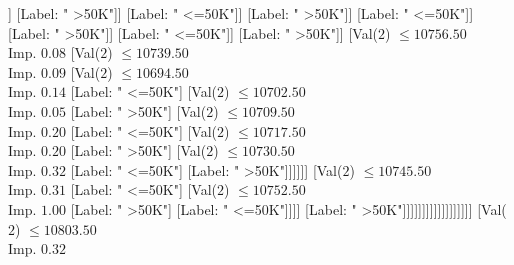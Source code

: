 \documentclass[margin=10pt]{standalone}
\begin{document}
\begin{forest}
																																		[Val($2$) $ \leq 10543.50$ \\ Imp. $0.16$
																																			[Val($2$) $ \leq 10534.50$ \\ Imp. $0.31$
																																				[Val($2$) $ \leq 10518.50$ \\ Imp. $0.19$
																																					[Val($2$) $ \leq 10517.50$ \\ Imp. $0.92$
																																						[Label: " >50K"]
																																						[Label: " <=50K"]]
																																					[Label: " >50K"]]
																																				[Label: " <=50K"]]
																																			[Label: " >50K"]]
																																		[Label: " <=50K"]]
																																	[Label: " >50K"]]
																																[Label: " <=50K"]]
																															[Label: " >50K"]]
																														[Val($2$) $ \leq 10756.50$ \\ Imp. $0.08$
																															[Val($2$) $ \leq 10739.50$ \\ Imp. $0.09$
																																[Val($2$) $ \leq 10694.50$ \\ Imp. $0.14$
																																	[Label: " <=50K"]
																																	[Val($2$) $ \leq 10702.50$ \\ Imp. $0.05$
																																		[Label: " >50K"]
																																		[Val($2$) $ \leq 10709.50$ \\ Imp. $0.20$
																																			[Label: " <=50K"]
																																			[Val($2$) $ \leq 10717.50$ \\ Imp. $0.20$
																																				[Label: " >50K"]
																																				[Val($2$) $ \leq 10730.50$ \\ Imp. $0.32$
																																					[Label: " <=50K"]
																																					[Label: " >50K"]]]]]]
																																[Val($2$) $ \leq 10745.50$ \\ Imp. $0.31$
																																	[Label: " <=50K"]
																																	[Val($2$) $ \leq 10752.50$ \\ Imp. $1.00$
																																		[Label: " >50K"]
																																		[Label: " <=50K"]]]]
																															[Label: " >50K"]]]]]]]]]]]]]]]]]]
														[Val($2$) $ \leq 10803.50$ \\ Imp. $0.32$

\end{forest}
\end{document}
